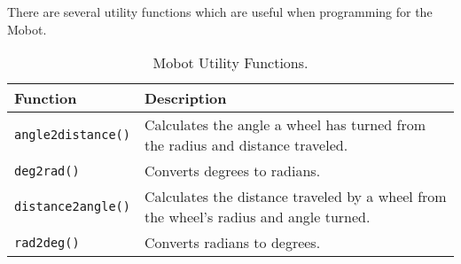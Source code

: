 \noindent
There are several utility functions which are useful when programming for
the Mobot. 

\begin{table}[!h]
\begin{center}
\caption{Mobot Utility Functions.}
\begin{tabular}{p{38 mm}p{110 mm}}
\hline
Function & Description \\
\hline
\texttt{angle2distance()} & Calculates the angle a wheel has turned from the
radius and distance traveled.\\
\texttt{deg2rad()} & Converts degrees to radians. \\
\texttt{distance2angle()} & Calculates the distance traveled by a wheel from the wheel's radius and angle turned.\\
\texttt{rad2deg()} & Converts radians to degrees.\\
\hline
\end{tabular}
\end{center}
\label{mobilec_api_cbinary}
\end{table}

\clearpage
\newpage




